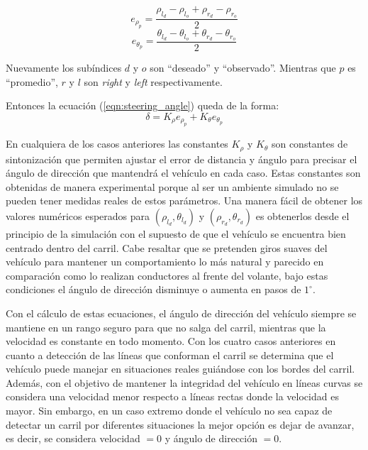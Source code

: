 \begin{equation}
    e_{\rho_{p}} = \frac{\rho_{l_{d}} - \rho_{l_{o}} + \rho_{r_{d}} - \rho_{r_o}}{2}
    \label{}
\end{equation}
\begin{equation}
    e_{\theta_{p}} = \frac{\theta_{l_{d}} - \theta_{l_{o}} + \theta_{r_{d}} - \theta_{r_{o}}}{2}
    \label{}
\end{equation}

Nuevamente los subíndices $d$ y $o$ son ``deseado'' y ``observado''. Mientras que $p$ es ``promedio'', $r$ y $l$ son \textit{right} y \textit{left} respectivamente.

Entonces la ecuación (\ref{eqn:steering_angle}) queda de la forma:
\begin{equation}
    \delta = K_\rho e_{\rho_{p}} + K_\theta e_{\theta_{p}}
\end{equation}


En cualquiera de los casos anteriores las constantes $K_\rho$ y $K_\theta$ son constantes de sintonización que permiten ajustar el error de distancia y ángulo para precisar el ángulo de dirección que mantendrá el vehículo en cada caso. Estas constantes son obtenidas de manera experimental porque al ser un ambiente simulado no se pueden tener medidas reales de estos parámetros. Una manera fácil de obtener los valores numéricos esperados para $(\rho_{l_{d}}, \theta_{l_{d}})$ y $(\rho_{r_{d}}, \theta_{r_{d}})$ es obtenerlos desde el principio de la simulación con el supuesto de que el vehículo se encuentra bien centrado dentro del carril. Cabe resaltar que se pretenden giros suaves del vehículo para mantener un comportamiento lo más natural y parecido en comparación como lo realizan conductores al frente del volante, bajo estas condiciones el ángulo de dirección disminuye o aumenta en pasos de $1^\circ$.

Con el cálculo de estas ecuaciones, el ángulo de dirección del vehículo siempre se mantiene en un rango seguro para que no salga del carril, mientras que la velocidad es constante en todo momento. Con los cuatro casos anteriores en cuanto a detección de las líneas que conforman el carril se determina que el vehículo puede manejar en situaciones reales guiándose con los bordes del carril. Además, con el objetivo de mantener la integridad del vehículo en líneas curvas se considera una velocidad menor respecto a líneas rectas donde la velocidad es mayor. Sin embargo, en un caso extremo donde el vehículo no sea capaz de detectar un carril por diferentes situaciones la mejor opción es dejar de avanzar, es decir, se considera velocidad $= 0$ y ángulo de dirección $=0$.

